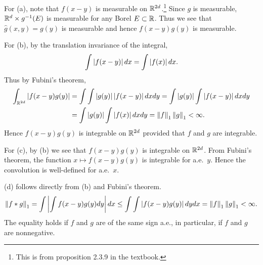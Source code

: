 \begin{pf}
    For (a), note that $f(x-y)$ is measurable on $\mathbb{R}^{2d}$.\footnote{This is from 
    proposition 2.3.9 in the textbook.} Since $g$ is measurable, $\mathbb{R}^d\times g^{-1}(E)$ 
    is measurable for any Borel $E\subset\mathbb{R}$. Thus we see that $\hat{g}(x,y) = g(y)$ 
    is measurable and hence $f(x-y)g(y)$ is measurable. 

    For (b), by the translation invariance of the integral, 
    \begin{equation*}
        \int \left\lvert {f(x-y)} \right\rvert dx = \int \left\lvert {f(x)} \right\rvert dx.
    \end{equation*}
    Thus by Fubini's theorem, 
    \begin{equation*}
        \begin{split}
            \int_{\mathbb{R}^{2d}} \left\lvert {f(x-y)g(y)} \right\rvert &= \int\int \left\lvert {g(y)} \right\rvert\left\lvert {f(x-y)} \right\rvert dx dy 
            = \int\left\lvert {g(y)} \right\rvert\int\left\lvert {f(x-y)} \right\rvert dx dy \\ 
            &= \int\left\lvert {g(y)} \right\rvert\int\left\lvert {f(x)} \right\rvert dx dy = \left\lVert {f} \right\rVert_1\left\lVert {g} \right\rVert_1 < \infty.
        \end{split}
    \end{equation*}
    Hence $f(x-y)g(y)$ is integrable on $\mathbb{R}^{2d}$ provided that $f$ and $g$ are integrable.

    For (c), by (b) we see that $f(x-y)g(y)$ is integrable on $\mathbb{R}^{2d}$. From 
    Fubini's theorem, the function $x\mapsto f(x-y)g(y)$ is integrable for a.e.\ $y$. 
    Hence the convolution is well-defined for a.e.\ $x$. 

    (d) follows directly from (b) and Fubini's theorem. 
    \begin{equation*}
        \left\lVert {f*g} \right\rVert_1 = \int \left\lvert {\int f(x-y)g(y)dy} \right\rvert dx \leq \int \int \left\lvert {f(x-y)g(y)} \right\rvert dydx 
        = \left\lVert {f} \right\rVert_1\left\lVert {g} \right\rVert_1<\infty.
    \end{equation*}
    The equality holds if $f$ and $g$ are of the same sign a.e., in particular, if 
    $f$ and $g$ are nonnegative. 


\end{pf}
